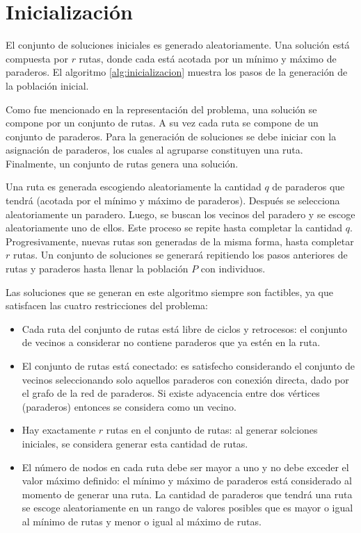 \section{Inicialización}

El conjunto de soluciones iniciales es generado aleatoriamente. Una solución está compuesta por $r$ rutas, donde cada está acotada por un mínimo y máximo de paraderos. El algoritmo \ref{alg:inicializacion} muestra los pasos de la generación de la población inicial.

Como fue mencionado en la representación del problema, una solución se compone por un conjunto de rutas. A su vez cada ruta se compone de un conjunto de paraderos. Para la generación de soluciones se debe iniciar con la asignación de paraderos, los cuales al agruparse constituyen una ruta. Finalmente, un conjunto de rutas genera una solución. 

Una ruta es generada escogiendo aleatoriamente la cantidad $q$ de paraderos que tendrá (acotada por el mínimo y máximo de paraderos). Después se selecciona aleatoriamente un paradero. Luego, se buscan los vecinos del paradero y se escoge aleatoriamente uno de ellos. Este proceso se repite hasta completar la cantidad $q$. Progresivamente, nuevas rutas son generadas de la misma forma, hasta completar $r$ rutas. Un conjunto de soluciones se generará repitiendo los pasos anteriores de rutas y paraderos hasta llenar la población $P$ con \popsize individuos.

Las soluciones que se generan en este algoritmo siempre son factibles, ya que satisfacen las cuatro restricciones del problema:
\begin{itemize}
\item Cada ruta del conjunto de rutas está libre de ciclos y retrocesos: el conjunto de vecinos a considerar no contiene paraderos que ya estén en la ruta.
\item El conjunto de rutas está conectado: es satisfecho considerando el conjunto de vecinos seleccionando solo aquellos paraderos con conexión directa, dado por el grafo de la red de paraderos. Si existe adyacencia entre dos vértices (paraderos) entonces se considera como un vecino.
\item Hay exactamente $r$ rutas en el conjunto de rutas: al generar solciones iniciales, se considera generar esta cantidad de rutas.
\item El número de nodos en cada ruta debe ser mayor a uno y no debe exceder el valor máximo definido: el mínimo y máximo de paraderos está considerado al momento de generar una ruta. La cantidad de paraderos que tendrá una ruta se escoge aleatoriamente en un rango de valores posibles que es mayor o igual al mínimo de rutas y menor o igual al máximo de rutas.
\end{itemize} 

